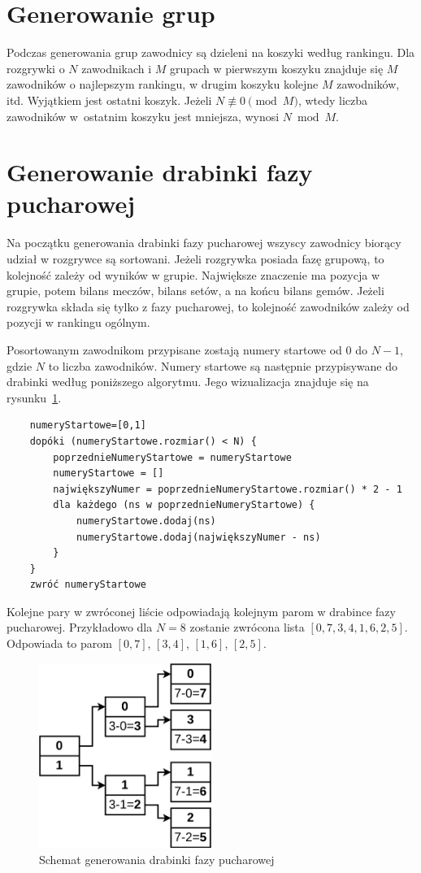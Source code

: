 \documentclass[shortabstract]{iithesis}
\begin{document}
\section{Generowanie grup}
Podczas generowania grup zawodnicy są dzieleni na koszyki według rankingu.
Dla rozgrywki o $N$ zawodnikach i $M$ grupach w pierwszym koszyku znajduje się $M$ zawodników o najlepszym rankingu, w drugim koszyku kolejne $M$ zawodników, itd.
Wyjątkiem jest ostatni koszyk. Jeżeli $N \not\equiv 0 \pmod{M}$, wtedy liczba zawodników w~ostatnim koszyku jest mniejsza, wynosi $N\bmod{M}$.
\section{Generowanie drabinki fazy pucharowej}
Na początku generowania drabinki fazy pucharowej wszyscy zawodnicy biorący udział w rozgrywce są sortowani.
Jeżeli rozgrywka posiada fazę grupową, to kolejność zależy od wyników w grupie.
Największe znaczenie ma pozycja w grupie, potem bilans meczów, bilans setów, a na końcu bilans gemów.
Jeżeli rozgrywka składa się tylko z fazy pucharowej, to kolejność zawodników zależy od pozycji w rankingu ogólnym.

Posortowanym zawodnikom przypisane zostają numery startowe od $0$ do $N-1$, gdzie $N$ to liczba zawodników.
Numery startowe są następnie przypisywane do drabinki według poniższego algorytmu. Jego wizualizacja znajduje się na rysunku~\ref{fig:knockout_bracket_generation}.
\begin{lstlisting}
    numeryStartowe=[0,1]
    dopóki (numeryStartowe.rozmiar() < N) {
        poprzednieNumeryStartowe = numeryStartowe
        numeryStartowe = []
        największyNumer = poprzednieNumeryStartowe.rozmiar() * 2 - 1
        dla każdego (ns w poprzednieNumeryStartowe) {
            numeryStartowe.dodaj(ns)
            numeryStartowe.dodaj(największyNumer - ns)
        }
    }
    zwróć numeryStartowe
\end{lstlisting}
Kolejne pary w zwróconej liście odpowiadają kolejnym parom w drabince fazy pucharowej.
Przykładowo dla $N=8$ zostanie zwrócona lista $[0, 7, 3, 4, 1, 6, 2, 5]$. Odpowiada to parom
$[0, 7]$, $[3, 4]$, $[1, 6]$, $[2, 5]$.
\begin{figure}[H]
    \centering
    \includegraphics[width=0.5\textwidth]{assets/generowanie_drabinki.png}
    \caption{Schemat generowania drabinki fazy pucharowej}
    \label{fig:knockout_bracket_generation}
\end{figure}
\end{document}
